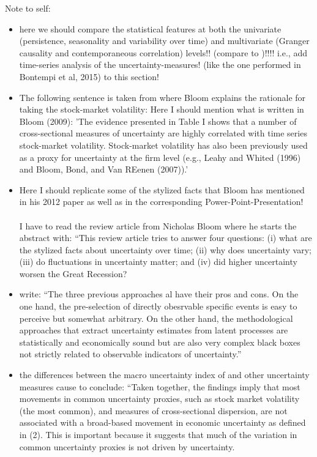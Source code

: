 \documentclass[a4paper,11pt,listof=nochaptergap,oneside,pointednumbers,bibtotoc,bigheadings,liststotoc]{scrbook}
\begin{document}
\begingroup
    \fontsize{8pt}{12pt}\selectfont
    Note to self:
\begin{itemize}
	\item here we should compare the statistical features at both the univariate (persistence, seasonality and variability over time) and multivariate (Granger causality and contemporaneous correlation) levels!! (compare to \citet{bontempietal:16})!!!! i.e., add time-series analysis of the uncertainty-measures! (like the one performed in Bontempi et al, 2015) to this section!
	\item The following sentence is taken from \citet{bloom:09} where Bloom explains the rationale for taking the stock-market volatility: Here I should mention what is written in Bloom (2009): 'The evidence presented in Table I shows that a number of cross-sectional measures of uncertainty are highly correlated with time series stock-market volatility. Stock-market volatility has also been previously used as a proxy for uncertainty at the firm level (e.g., Leahy and Whited (1996) and Bloom, Bond, and Van REenen (2007)).'
	\item Here I should replicate some of the stylized facts that Bloom has mentioned in his 2012 paper as well as in the corresponding Power-Point-Presentation!\\
\\
I have to read the review article from Nicholas Bloom where he starts the abstract with: ``This review article tries to answer four questions: (i) what are the stylized facts about uncertainty over time; (ii) why does uncertainty vary; (iii) do fluctuations in uncertainty matter; and (iv) did higher uncertainty worsen the Great Recession?
	\item \citet[p. 3]{bontempietal:16} write: ``The three previous approaches al have their pros and cons. On the one hand, the pre-selection of directly obesrvable specific events is easy to perceive but somewhat arbitrary. On the other hand, the methodological approaches that extract uncertainty estimates from latent processes are statistically and economically sound but are also very complex black boxes not strictly related to observable indicators of uncertainty.''
	\item the differences between the macro uncertainty index of \citet{juradoetal:15} and other uncertainty measures cause \citet[p. 1180]{juradoetal:15} to conclude: ``Taken together, the findings imply that most movements in common uncertainty proxies, such as stock market volatility (the most common), and measures of cross-sectional dispersion, are not associated with a broad-based movement in economic uncertainty as defined in (2). This is important because it suggests that much of the variation in common uncertainty proxies is not driven by uncertainty.
\end{itemize}
\endgroup
\end{document}
